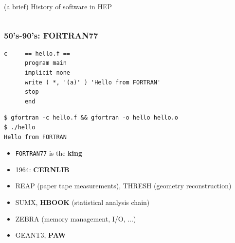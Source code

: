\documentclass[9pt]{beamer}
\begin{document}
\begin{frame}[fragile]
	\begin{columns}
		\begin{column}{0.70\textwidth}
			\begin{block}{}
				\begin{center}
(a brief) History of software in HEP
				\end{center}
			\end{block}
		\end{column}
	\end{columns}




\end{frame}

\begin{frame}[fragile]
\frametitle{50's-90's: FORTRAN77}

	\begin{block}{}
\begin{verbatim}
c     == hello.f ==
      program main
      implicit none
      write ( *, '(a)' ) 'Hello from FORTRAN'
      stop
      end
\end{verbatim}
	\end{block}{}


	\begin{exampleblock}{}
\begin{verbatim}
$ gfortran -c hello.f && gfortran -o hello hello.o
$ ./hello
Hello from FORTRAN
\end{verbatim}
	\end{exampleblock}{}


\begin{itemize}
\item \texttt{FORTRAN77} is the \textbf{king}
\item 1964: \textbf{CERNLIB}
\item REAP (paper tape measurements), THRESH (geometry reconstruction)
\item SUMX, \textbf{HBOOK} (statistical analysis chain)
\item ZEBRA (memory management, I/O, ...)
\item GEANT3, \textbf{PAW}
\end{itemize}


\end{frame}
\end{document}
